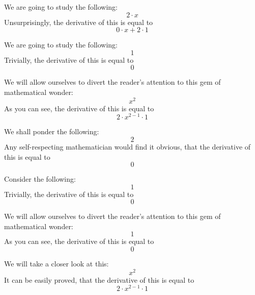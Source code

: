 \documentclass{article}
\begin{document}
We are going to study the following:
\begin{equation}
2 \cdot x 
\end{equation}
Unsurprisingly, the derivative of this is equal to
\begin{equation}
0 \cdot x + 2 \cdot 1 
\end{equation}

We are going to study the following:
\begin{equation}
1 
\end{equation}
Trivially, the derivative of this is equal to
\begin{equation}
0 
\end{equation}

We will allow ourselves to divert the reader's attention to this gem of mathematical wonder:
\begin{equation}
x ^{2 } 
\end{equation}
As you can see, the derivative of this is equal to
\begin{equation}
2 \cdot x ^{2 - 1 } \cdot 1 
\end{equation}

We shall ponder the following:
\begin{equation}
2 
\end{equation}
Any self-respecting mathematician would find it obvious, that the derivative of this is equal to
\begin{equation}
0 
\end{equation}

Consider the following:
\begin{equation}
1 
\end{equation}
Trivially, the derivative of this is equal to
\begin{equation}
0 
\end{equation}

We will allow ourselves to divert the reader's attention to this gem of mathematical wonder:
\begin{equation}
1 
\end{equation}
As you can see, the derivative of this is equal to
\begin{equation}
0 
\end{equation}

We will take a closer look at this:
\begin{equation}
x ^{2 } 
\end{equation}
It can be easily proved, that the derivative of this is equal to
\begin{equation}
2 \cdot x ^{2 - 1 } \cdot 1 
\end{equation}
\end{document}

